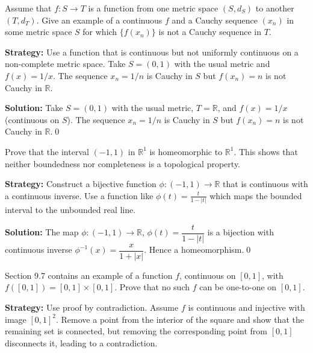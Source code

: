 \begin{problembox}
Assume that $f : S \rightarrow T$ is a function from one metric space $(S, d_S)$ to another $(T, d_T)$. Give an example of a continuous $f$ and a Cauchy sequence $(x_n)$ in some metric space $S$ for which $\{f(x_n)\}$ is not a Cauchy sequence in $T$.
\end{problembox}

\noindent\textbf{Strategy:} Use a function that is continuous but not uniformly continuous on a non-complete metric space. Take $S = (0,1)$ with the usual metric and $f(x) = 1/x$. The sequence $x_n = 1/n$ is Cauchy in $S$ but $f(x_n) = n$ is not Cauchy in $\mathbb{R}$.

\bigskip\noindent\textbf{Solution:}
Take $S=(0,1)$ with the usual metric, $T=\mathbb{R}$, and $f(x)=1/x$ (continuous on $S$). The sequence $x_n=1/n$ is Cauchy in $S$ but $f(x_n)=n$ is not Cauchy in $\mathbb{R}$.\qed



\begin{problembox}
Prove that the interval $(-1, 1)$ in $\mathbb{R}^1$ is homeomorphic to $\mathbb{R}^1$. This shows that neither boundedness nor completeness is a topological property.
\end{problembox}

\noindent\textbf{Strategy:} Construct a bijective function $\phi: (-1,1) \to \mathbb{R}$ that is continuous with a continuous inverse. Use a function like $\phi(t) = \frac{t}{1-|t|}$ which maps the bounded interval to the unbounded real line.

\bigskip\noindent\textbf{Solution:}
The map $\phi:(-1,1)\to\mathbb{R}$, $\phi(t)=\dfrac{t}{1-|t|}$ is a bijection with continuous inverse $\phi^{-1}(x)=\dfrac{x}{1+|x|}$. Hence a homeomorphism.\qed



\begin{problembox}
Section 9.7 contains an example of a function $f$, continuous on $[0, 1]$, with $f([0, 1]) = [0, 1] \times [0, 1]$. Prove that no such $f$ can be one-to-one on $[0, 1]$.
\end{problembox}

\noindent\textbf{Strategy:} Use proof by contradiction. Assume $f$ is continuous and injective with image $[0,1]^2$. Remove a point from the interior of the square and show that the remaining set is connected, but removing the corresponding point from $[0,1]$ disconnects it, leading to a contradiction.

